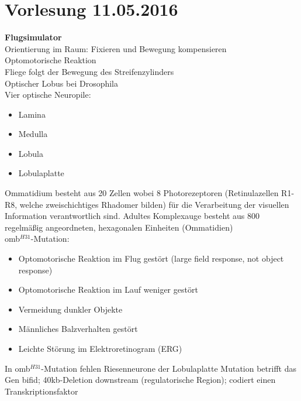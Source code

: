 \section{Vorlesung 11.05.2016}

\textbf{Flugsimulator}\\
Orientierung im Raum: Fixieren und Bewegung kompensieren\\
Optomotorische Reaktion\\
Fliege folgt der Bewegung des Streifenzylinders\\
Optischer Lobus bei Drosophila\\
Vier optische Neuropile:
\begin{itemize}
	\item Lamina
	\item Medulla
	\item Lobula
	\item Lobulaplatte
\end{itemize}

Ommatidium besteht aus 20 Zellen wobei 8 Photorezeptoren (Retinulazellen R1-R8, welche zweischichtiges Rhadomer bilden) für die Verarbeitung der visuellen Information verantwortlich sind. Adultes Komplexauge besteht aus 800 regelmäßig angeordneten, hexagonalen Einheiten (Ommatidien)\\

omb$^{H31}$-Mutation:
\begin{itemize}
	\item Optomotorische Reaktion im Flug gestört (large field response, not object response)
	\item Optomotorische Reaktion im Lauf weniger gestört
	\item Vermeidung dunkler Objekte
	\item Männliches Balzverhalten gestört
	\item Leichte Störung im Elektroretinogram (ERG)
\end{itemize}

In omb$^{H31}$-Mutation fehlen Riesenneurone der Lobulaplatte
Mutation betrifft das Gen bifid; 40kb-Deletion downstream (regulatorische Region); codiert einen Transkriptionsfaktor\\

